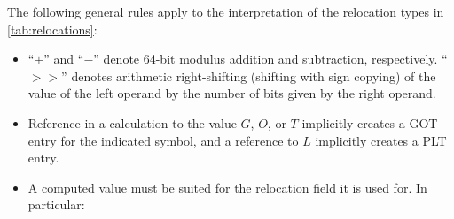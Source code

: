 \documentclass[english,11pt,twoside,toc=bib,toc=idx]{scrreprt}
\newcommand{\NBITS}{64}
\newcommand{\NBITS}{32}
\begin{document}
The following general rules apply to the interpretation of the relocation
types in \cref{tab:relocations}:

\begin{itemize}
\item ``$+$'' and ``$-$'' denote \NBITS{}-bit modulus addition and
  subtraction, respectively.  ``$>>$'' denotes arithmetic right-shifting
  (shifting with sign copying) of the value of the left operand by the
  number of bits given by the right operand.
\item Reference in a calculation to the value $G$, $O$, or $T$ implicitly
  creates a GOT entry for the indicated symbol, and a reference to $L$
  implicitly creates a PLT entry.
\item A computed value must be suited for the relocation field it is used
  for.  In particular:
\end{itemize}
\end{document}
